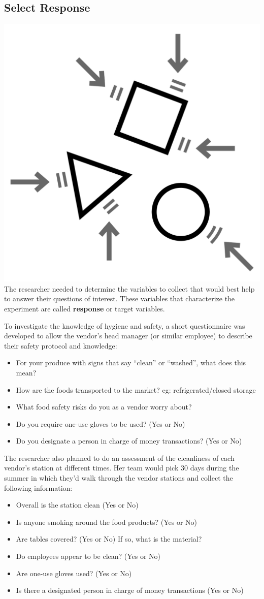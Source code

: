 \documentclass[
]{book}
\providecommand{\tightlist}{%
  \setlength{\itemsep}{0pt}\setlength{\parskip}{0pt}}
\theoremstyle{definition}
\theoremstyle{definition}
\theoremstyle{definition}
\theoremstyle{remark}
\begin{document}
\hypertarget{select-response}{%
\subsection{Select Response}\label{select-response}}

\includegraphics[width=0.13\linewidth,style="float:left; padding:10px"]{img/selectResponse}
The researcher needed to determine the variables to collect that would best help to answer their questions of interest. These variables that characterize the experiment are called \textbf{response} or target variables.

To investigate the knowledge of hygiene and safety, a short questionnaire was developed to allow the vendor's head manager (or similar employee) to describe their safety protocol and knowledge:

\begin{itemize}
\tightlist
\item
  For your produce with signs that say ``clean'' or ``washed'', what does this mean?
\item
  How are the foods transported to the market? eg: refrigerated/closed storage\\
\item
  What food safety risks do you as a vendor worry about?\\
\item
  Do you require one-use gloves to be used? (Yes or No)\\
\item
  Do you designate a person in charge of money transactions? (Yes or No)
\end{itemize}

The researcher also planned to do an assessment of the cleanliness of each vendor's station at different times. Her team would pick 30 days during the summer in which they'd walk through the vendor stations and collect the following information:

\begin{itemize}
\tightlist
\item
  Overall is the station clean (Yes or No)\\
\item
  Is anyone smoking around the food products? (Yes or No)\\
\item
  Are tables covered? (Yes or No) If so, what is the material?\\
\item
  Do employees appear to be clean? (Yes or No)\\
\item
  Are one-use gloves used? (Yes or No)\\
\item
  Is there a designated person in charge of money transactions (Yes or No)
\end{itemize}
\end{document}

